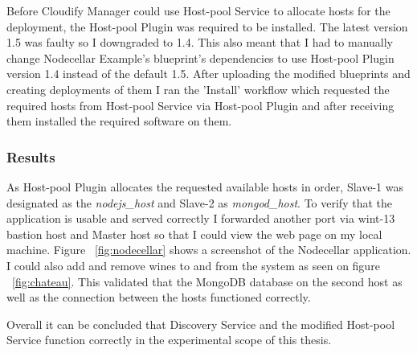 Before Cloudify Manager could use Host-pool Service to allocate hosts for the deployment, the Host-pool Plugin was required to be installed. The latest version 1.5 was faulty so I downgraded to 1.4. This also meant that I had to manually change Nodecellar Example's blueprint's dependencies to use Host-pool Plugin version 1.4 instead of the default 1.5. After uploading the modified blueprints and creating deployments of them I ran the 'Install' workflow which requested the required hosts from Host-pool Service via Host-pool Plugin and after receiving them installed the required software on them.

\subsubsection*{Results}

As Host-pool Plugin allocates the requested available hosts in order, Slave-1 was designated as the \textit{nodejs\_host} and Slave-2 as \textit{mongod\_host}. To verify that the application is usable and served correctly I forwarded another port via wint-13 bastion host and Master host so that I could  view the web page on my local machine. Figure ~\ref{fig:nodecellar} shows a screenshot of the Nodecellar application. I could also add and remove wines to and from the system as seen on figure ~\ref{fig:chateau}. This validated that the MongoDB database on the second host as well as the connection between the hosts functioned correctly.

Overall it can be concluded that Discovery Service and the modified Host-pool Service function correctly in the experimental scope of this thesis.


\newpage